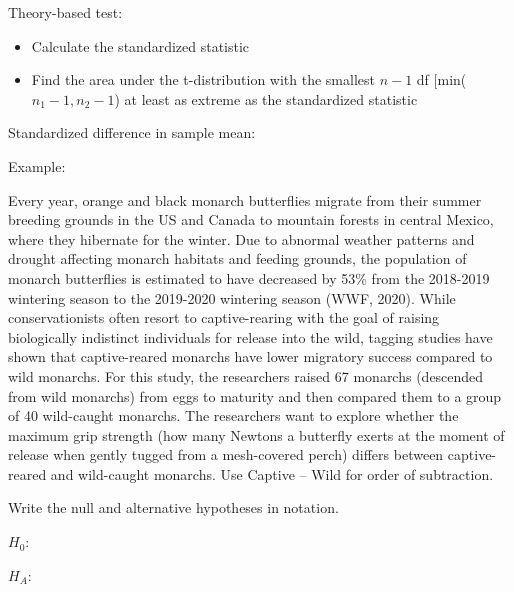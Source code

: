 \documentclass[
]{report}
\begin{document}

Theory-based test:

\begin{itemize}
\item
  Calculate the standardized statistic
\item
  Find the area under the t-distribution with the smallest \(n - 1\) df {[}min(\(n_1-1, n_2-1\)) at least as extreme as the standardized statistic
\end{itemize}

Standardized difference in sample mean:

\vspace{0.8in}

Example:

Every year, orange and black monarch butterflies migrate from their summer breeding grounds in the US and Canada to mountain forests in central Mexico, where they hibernate for the winter. Due to abnormal weather patterns and drought affecting monarch habitats and feeding grounds, the population of monarch butterflies is estimated to have decreased by 53\% from the 2018-2019 wintering season to the 2019-2020 wintering season (WWF, 2020). While conservationists often resort to captive-rearing with the goal of raising biologically indistinct individuals for release into the wild, tagging studies have shown that captive-reared monarchs have lower migratory success compared to wild monarchs. For this study, the researchers raised 67 monarchs (descended from wild monarchs) from eggs to maturity and then compared them to a group of 40 wild-caught monarchs. The researchers want to explore whether the maximum grip strength (how many Newtons a butterfly exerts at the moment of release when gently tugged from a mesh-covered perch) differs between captive-reared and wild-caught monarchs. Use Captive -- Wild for order of subtraction.

Write the null and alternative hypotheses in notation.

\(H_0:\)

\vspace{0.2in}

\(H_A:\)

\vspace{0.2in}
\end{document}
